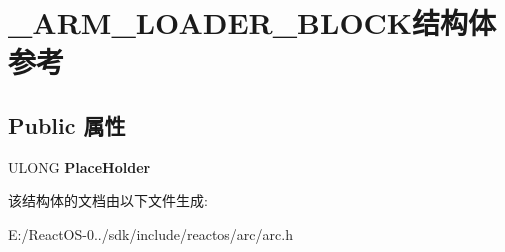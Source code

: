 \hypertarget{struct___a_r_m___l_o_a_d_e_r___b_l_o_c_k}{}\section{\+\_\+\+A\+R\+M\+\_\+\+L\+O\+A\+D\+E\+R\+\_\+\+B\+L\+O\+C\+K结构体 参考}
\label{struct___a_r_m___l_o_a_d_e_r___b_l_o_c_k}
\subsection*{Public 属性}
\begin{DoxyCompactItemize}
\item 
\mbox{\label{struct___a_r_m___l_o_a_d_e_r___b_l_o_c_k_a8ff3c9057fd384b1c84894c77c786bd4}} 
U\+L\+O\+NG {\bfseries Place\+Holder}
\end{DoxyCompactItemize}


该结构体的文档由以下文件生成\+:\begin{DoxyCompactItemize}
\item 
E\+:/\+React\+O\+S-\/0../sdk/include/reactos/arc/arc.\+h\end{DoxyCompactItemize}
